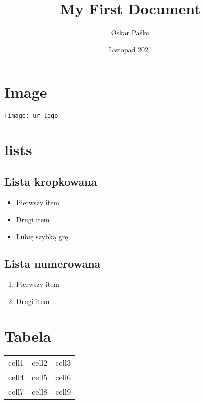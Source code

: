 \documentclass[12pt, letterpaper]{article}
\title{My First Document}
\author{Oskar Paśko}
\date{Listopad 2021}
\begin{document}
\maketitle
\newpage

\tableofcontents

\newpage

\section{Image}

\texttt{[image: ur\_logo]}

\section{lists}

\subsection{Lista kropkowana}
\begin{itemize}
\item Pierwszy item
\item Drugi item
\item Lubię szybką grę
\end{itemize}

\subsection{Lista numerowana}
\begin{enumerate}
\item Pierwszy item
\item Drugi item
\end{enumerate}

\section{Tabela}

\begin{center}
\begin{tabular}{|c|c|c|}
\hline
cell1 & cell2 & cell3 \\
cell4 & cell5 & cell6 \\
cell7 & cell8 & cell9 \\
\hline
\end{tabular}
\end{center}
\end{document}
